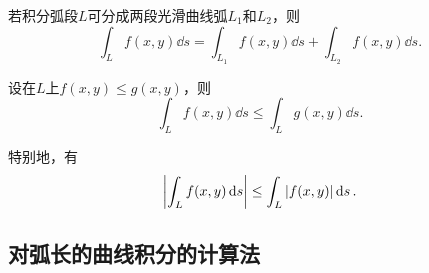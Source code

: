 \begin{property}\label{theorem:线积分与面积分.第一类曲线积分性质2}
若积分弧段\(L\)可分成两段光滑曲线弧\(L_1\)和\(L_2\)，则\[
	\int_L f(x,y) \dd{s}
	=\int_{L_1} f(x,y) \dd{s}
	+\int_{L_2} f(x,y) \dd{s}.
\]
\end{property}

\begin{property}\label{theorem:线积分与面积分.第一类曲线积分性质3}
设在\(L\)上\(f(x,y) \leq g(x,y)\)，则\[
	\int_L f(x,y) \dd{s}
	\leq
	\int_L g(x,y) \dd{s}.
\]

特别地，有\[
	\abs{\int_L f(x,y) \dd{s}} \leq \int_L \abs{f(x,y)} \dd{s}.
\]
\end{property}

\subsection{对弧长的曲线积分的计算法}
